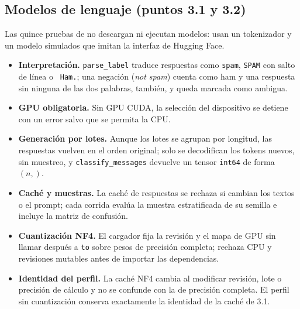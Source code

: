 \subsection{Modelos de lenguaje (puntos 3.1 y 3.2)}
Las quince pruebas de  no descargan ni ejecutan
modelos: usan un tokenizador y un modelo simulados que imitan la interfaz de
Hugging Face.

\begin{itemize}
    \item \textbf{Interpretación.} \texttt{parse\_label} traduce respuestas
    como \texttt{spam}, \texttt{SPAM} con salto de línea o \texttt{ Ham.};
    una negación (\emph{not spam}) cuenta como ham y una respuesta sin ninguna
    de las dos palabras, también, y queda marcada como ambigua.
    \item \textbf{GPU obligatoria.} Sin GPU CUDA, la selección del
    dispositivo se detiene con un error salvo que se permita la CPU.
    \item \textbf{Generación por lotes.} Aunque los lotes se agrupan por
    longitud, las respuestas vuelven en el orden original; solo se
    decodifican los tokens nuevos, sin muestreo, y \texttt{classify\_messages}
    devuelve un tensor \texttt{int64} de forma $(n,)$.
    \item \textbf{Caché y muestras.} La caché de respuestas se rechaza si
    cambian los textos o el prompt; cada corrida evalúa la muestra
    estratificada de su semilla e incluye la matriz de confusión.
    \item \textbf{Cuantización NF4.} El cargador fija la revisión y el mapa
    de GPU sin llamar después a \texttt{to} sobre pesos de precisión completa;
    rechaza CPU y revisiones mutables antes de importar las dependencias.
    \item \textbf{Identidad del perfil.} La caché NF4 cambia al modificar
    revisión, lote o precisión de cálculo y no se confunde con la de
    precisión completa. El perfil sin cuantización conserva exactamente
    la identidad de la caché de 3.1.
\end{itemize}
